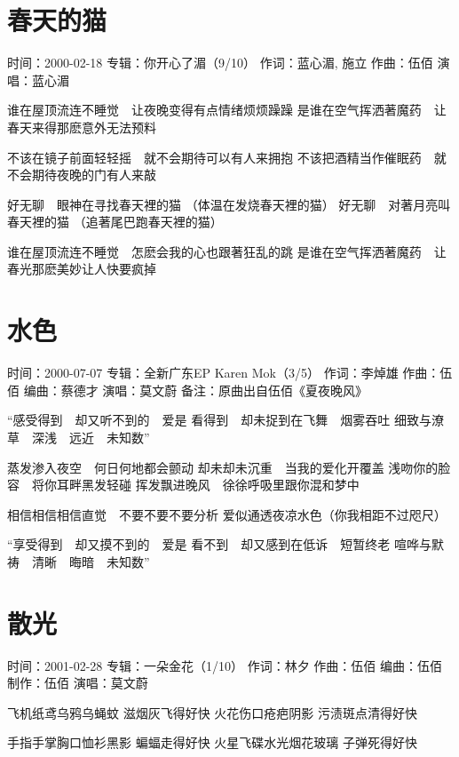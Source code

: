\documentclass[UTF8,a4paper,oneside,twocolumn,12pt]{ctexbook}
\newcommand{\infopair}[2]{\textbullet #1：#2}
\newcommand{\zc}[1][伍佰]{\infopair{作词}{#1}}
\newcommand{\zq}[1][伍佰]{\infopair{作曲}{#1}}
\newcommand{\bq}[1][伍佰]{\infopair{编曲}{#1}}
\newcommand{\zj}[1]{\infopair{专辑}{#1}}
\newcommand{\zz}[1]{\infopair{制作}{#1}}
\newcommand{\sj}[1]{\infopair{时间}{#1}}
\newcommand{\bz}[1]{\infopair{备注}{#1}}
\newenvironment{info}{\begin{flushleft}\kaishu
	}
	{\end{flushleft}\normalsize\yahei\par}
\newenvironment{lyric}{
	}
{}
\begin{document}
\section{春天的猫}
\begin{info}
	\sj{2000-02-18}
	\zj{你开心了湄（9/10）}
	\zc[蓝心湄, 施立]
	\zq
	\infopair{演唱}{蓝心湄}
\end{info}
\begin{lyric}
	谁在屋顶流连不睡觉　让夜晚变得有点情绪烦烦躁躁
	是谁在空气挥洒著魔药　让春天来得那麽意外无法预料

	不该在镜子前面轻轻摇　就不会期待可以有人来拥抱
	不该把酒精当作催眠药　就不会期待夜晚的门有人来敲

	好无聊　眼神在寻找春天裡的猫 （体温在发烧春天裡的猫）
	好无聊　对著月亮叫春天裡的猫 （追著尾巴跑春天裡的猫）

	谁在屋顶流连不睡觉　怎麽会我的心也跟著狂乱的跳
	是谁在空气挥洒著魔药　让春光那麽美妙让人快要疯掉
\end{lyric}

\section{水色}
\begin{info}
	\sj{2000-07-07}%
	\zj{全新广东EP Karen Mok（3/5）}
	\zc[李焯雄]
	\zq
	\bq[蔡德才]
	\infopair{演唱}{莫文蔚}
	\bz{原曲出自伍佰《夏夜晚风》}
\end{info}
\begin{lyric}
	“感受得到　却又听不到的　爱是
	看得到　却未捉到在飞舞　烟雾吞吐
	细致与潦草　深浅　远近　未知数”

	蒸发渗入夜空　何日何地都会颤动
	却未却未沉重　当我的爱化开覆盖
	浅吻你的脸容　将你耳畔黑发轻碰
	挥发飘进晚风　徐徐呼吸里跟你混和梦中

	相信相信相信直觉　不要不要不要分析
	爱似通透夜凉水色（你我相距不过咫尺）

	“享受得到　却又摸不到的　爱是
	看不到　却又感到在低诉　短暂终老
	喧哗与默祷　清晰　晦暗　未知数”
\end{lyric}

\section{散光}
\begin{info}
	\sj{2001-02-28}
	\zj{一朵金花（1/10）}
	\zc[林夕]
	\zq
	\bq[伍佰]
	\zz{伍佰}
	\infopair{演唱}{莫文蔚}
\end{info}
\begin{lyric}
	飞机纸鸢乌鸦乌蝇蚊 滋烟灰飞得好快
	火花伤口疮疤阴影 污渍斑点清得好快

	手指手掌胸口恤衫黑影 蝙蝠走得好快
	火星飞碟水光烟花玻璃 子弹死得好快
\end{lyric}
\end{document}
